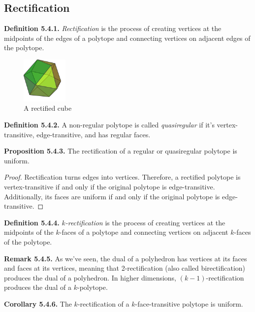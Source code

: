\documentclass[../main.tex]{subfiles}
\begin{document}
\subsection{Rectification}

\noindent\textbf{Definition 5.4.1.} \textit{Rectification} is the process of creating vertices at the midpoints of the edges of a polytope and connecting vertices on adjacent edges of the polytope.\newline

\begin{figure}[ht]
    \centering
    \includegraphics[width=0.2\textwidth]{uniform/Cuboctahedron.png}
    \caption{A rectified cube}
    \label{}
\end{figure}

\noindent\textbf{Definition 5.4.2.} A non-regular polytope is called \textit{quasiregular} if it's vertex-transitive, edge-transitive, and has regular faces.\newline

\noindent\textbf{Proposition 5.4.3.} The rectification of a regular or quasiregular polytope is uniform.
\begin{proof}
    Rectification turns edges into vertices. Therefore, a rectified polytope is vertex-transitive if and only if the original polytope is edge-transitive. Additionally, its faces are uniform if and only if the original polytope is edge-transitive.
\end{proof}

\noindent\textbf{Definition 5.4.4.} \textit{$k$-rectification} is the process of creating vertices at the midpoints of the $k$-faces of a polytope and connecting vertices on adjacent $k$-faces of the polytope.\newline

\noindent\textbf{Remark 5.4.5.} As we've seen, the dual of a polyhedron has vertices at its faces and faces at its vertices, meaning that 2-rectification (also called birectification) produces the dual of a polyhedron. In higher dimensions, $(k-1)$-rectification produces the dual of a $k$-polytope.\newline

\noindent\textbf{Corollary 5.4.6.} The $k$-rectification of a $k$-face-transitive polytope is uniform.\newline
\end{document}
